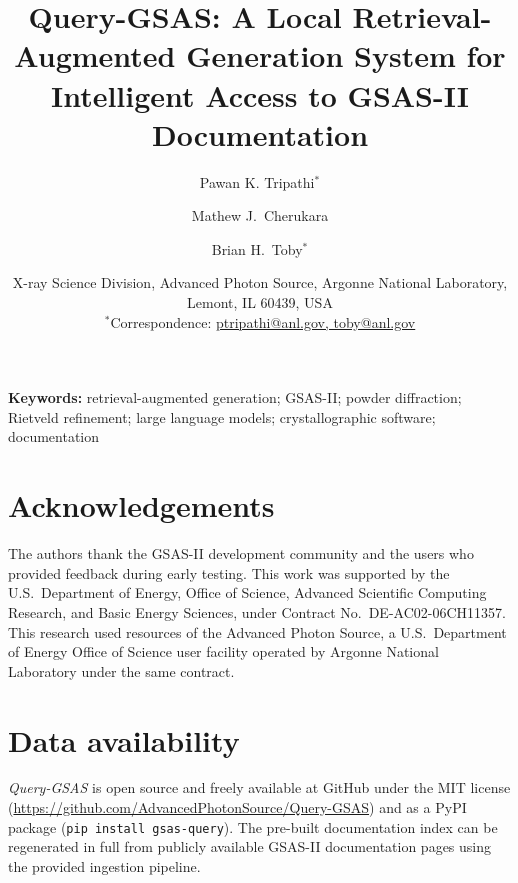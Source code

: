\documentclass[12pt,a4paper]{article}
\title{\textbf{Query-GSAS: A Local Retrieval-Augmented Generation System
       for Intelligent Access to GSAS-II Documentation}}
\author{
  Pawan K. Tripathi$^{\ast}$ \and
  Mathew J.\ Cherukara \and
  Brian H.\ Toby$^{\ast}$
}
\date{
  X-ray Science Division, Advanced Photon Source,
  Argonne National Laboratory, Lemont, IL 60439, USA \\[4pt]
  $^{\ast}$Correspondence: \href{mailto:ptripathi@anl.gov,toby@anl.gov}{ptripathi@anl.gov, toby@anl.gov}
}
\begin{document}
\maketitle
\linenumbers

\begin{abstract}
  
\end{abstract}

\noindent\textbf{Keywords:} retrieval-augmented generation; GSAS-II;
powder diffraction; Rietveld refinement; large language models;
crystallographic software; documentation

\clearpage















\section*{Acknowledgements}
The authors thank the GSAS-II development community and the users who
provided feedback during early testing.
This work was supported by the U.S.\ Department of Energy, Office of
Science, Advanced Scientific Computing Research, and Basic Energy
Sciences, under Contract No.\ DE-AC02-06CH11357.
This research used resources of the Advanced Photon Source, a
U.S.\ Department of Energy Office of Science user facility operated
by Argonne National Laboratory under the same contract.

\section*{Data availability}
\textit{Query-GSAS} is open source and freely available at GitHub
under the MIT license (\url{https://github.com/AdvancedPhotonSource/Query-GSAS})
and as a PyPI package (\texttt{pip install gsas-query}).
The pre-built documentation index can be regenerated in full from
publicly available GSAS-II documentation pages using the provided
ingestion pipeline.



\end{document}
